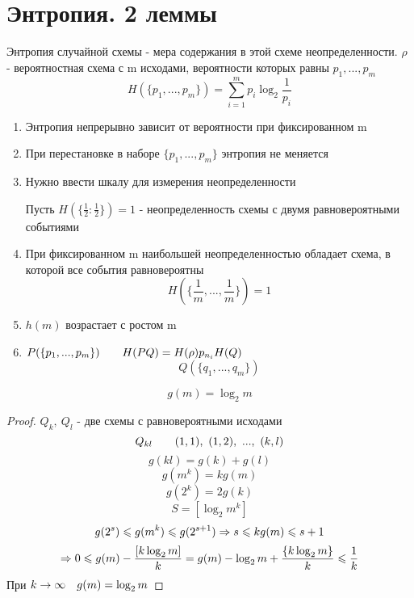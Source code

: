 \documentclass[discrete.tex]{subfiles}
\begin{document}
\section{Энтропия. 2 леммы}
\begin{definition}
  Энтропия случайной схемы - мера содержания в этой схеме неопределенности. $\rho$ - вероятностная схема с m исходами, вероятности которых равны $p_1,...,p_m$
  \[H(\{p_1,...,p_m\}) = \sum_{i=1}^m p_i \log_2 \frac{1}{p_i}\]
\end{definition}

\begin{properties}
  \begin{enumerate}
    \item Энтропия непрерывно зависит от вероятности при фиксированном m
    \item При перестановке в наборе $\{ p_1,...,p_m\}$ энтропия не меняется
    \item Нужно ввести шкалу для измерения неопределенности

    Пусть $H(\{ \frac{1}{2} : \frac{1}{2}\}) = 1$ - неопределенность схемы с двумя равновероятными событиями
    \item При фиксированном m наибольшей неопределенностью обладает схема, в которой все события равновероятны
    \[H(\{\frac{1}{m},...,\frac{1}{m}\}) = 1\]
    \item $h(m)$ возрастает с ростом m
    \item $P(\{ p_1,...,p_m\}) \qquad H(PQ) = H(\rho) p_{n_i}H(Q)$
    \[Q(\{q_1,...,q_m\})\]
  \end{enumerate}
\end{properties}

\begin{Lemma}
  \[g(m) = \log_2 m\]
\end{Lemma}

\begin{proof}
  $Q_k,\ Q_l$ - две схемы с равновероятными исходами
  \[Q_{kl} \qquad (1,1),\ (1,2),\ ...,\ (k,l)\]
  \[g(kl) = g(k) + g(l)\]
  \[g(m^k) = k g(m)\]
  \[g(2^k) = 2 g(k)\]
  \[S = [\log_2 m^k]\]
  \[g(2^s) \leqslant g(m^k) \leqslant g(2^{s+1}) \Rightarrow s \leqslant k g(m) \leqslant s+1\]
  \[\Rightarrow 0 \leqslant g(m) - \frac{[k \log_2 m]}{k} = g(m) - \log_2 m + \frac{\{k \log_2 m\}}{k} \leqslant \frac{1}{k}\]
  При $k \rightarrow \infty \quad g(m) = \log_2 m$
\end{proof}
\end{document}
